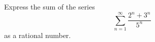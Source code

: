Express the sum of the series 
\[
\sum\limits_{n=1}^{\infty} \frac{2^n+3^n}{5^n}
\]
as a rational number.

